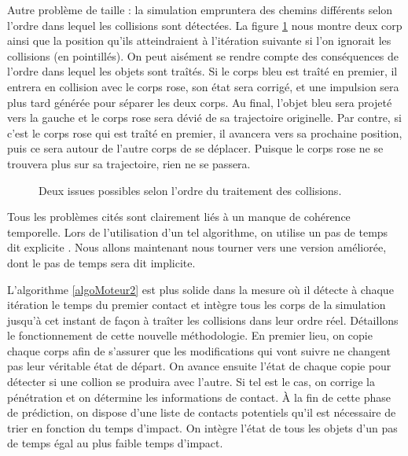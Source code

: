 Autre problème de taille : la simulation empruntera des chemins
différents selon l'ordre dans lequel les collisions sont détectées. La
figure \ref{ordre} nous montre deux corp ainsi que la position qu'ils
atteindraient à l'itération suivante si l'on ignorait les collisions
(en pointillés). On peut aisément se rendre compte des conséquences de
l'ordre dans lequel les objets sont traîtés. Si le corps bleu est
traîté en premier, il entrera en collision avec le corps rose, son
état sera corrigé, et une impulsion sera plus tard générée pour
séparer les deux corps. Au final, l'objet bleu sera projeté vers la
gauche et le corps rose sera dévié de sa trajectoire originelle. Par
contre, si c'est le corps rose qui est traîté en premier, il avancera
vers sa prochaine position, puis ce sera autour de l'autre corps de se
déplacer. Puisque le corps rose ne se trouvera plus sur sa
trajectoire, rien ne se passera.

\begin{figure}[h]
  \centering
  \subfloat{  }
  \caption{Deux issues possibles selon l'ordre du traitement des collisions.}
  \label{ordre}
\end{figure}

Tous les problèmes cités sont clairement liés à un manque de cohérence
temporelle. Lors de l'utilisation d'un tel algorithme, on utilise un
pas de temps dit explicite \cite{garstenauer}. Nous allons maintenant
nous tourner vers une version améliorée, dont le pas de temps sera dit
implicite.

L'algorithme \ref{algoMoteur2} est plus solide dans la mesure o\`u il
détecte à chaque itération le temps du premier contact et intègre tous
les corps de la simulation jusqu'à cet instant de façon à traîter les
collisions dans leur ordre réel. Détaillons le fonctionnement de cette
nouvelle méthodologie. En premier lieu, on copie chaque corps afin de
s'assurer que les modifications qui vont suivre ne changent pas leur
véritable état de départ. On avance ensuite l'état de chaque copie
pour détecter si une collion se produira avec l'autre. Si tel est le
cas, on corrige la pénétration et on détermine les informations de
contact. \`A la fin de cette phase de prédiction, on dispose d'une
liste de contacts potentiels qu'il est nécessaire de trier en fonction
du temps d'impact. On intègre l'état de tous les objets d'un pas de
temps égal au plus faible temps d'impact.

